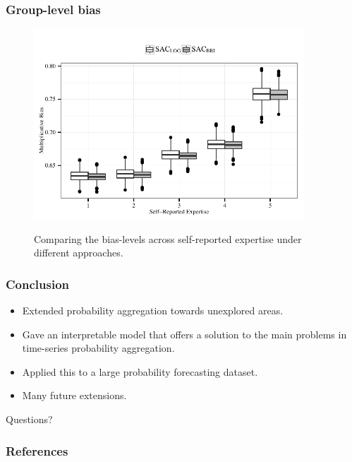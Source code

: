 \documentclass{beamer}
\begin{document}
\begin{frame}
\frametitle{Group-level bias}
\vspace{-0.9em}
\begin{figure}[!ht]
\includegraphics[width = 4in]{Figures/BiasesBoxplots}
\label{BiasesLOGBoxplots}
\vspace{-1em}
\caption[Optional caption for list of figures]{Comparing the bias-levels across self-reported expertise under different approaches.}
\label{Biases}
\end{figure}
\end{frame}

\begin{frame}
\frametitle{Conclusion}
\begin{itemize}
\item Extended probability aggregation towards unexplored areas.
\item Gave an interpretable model that offers a solution to the main problems in time-series probability aggregation.
\item Applied this to a large probability forecasting dataset.
\item Many future extensions.
\end{itemize}

\end{frame}



\begin{frame}
\centering 
\hspace{12em}Questions?
\end{frame}

 
       \begin{frame}
\frametitle{References}
\tiny
 
%
\end{frame}
\end{document}
